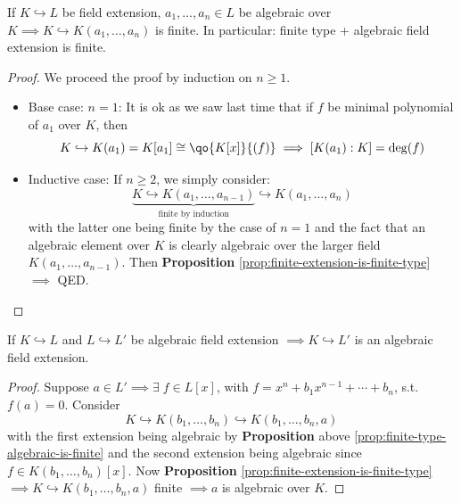 \begin{proposition}
	\label{prop:finite-type-algebraic-is-finite}
	If \( K \hookrightarrow L \) be field extension, \( a_1,\ldots,a_n \in L \) be algebraic over \( K  \implies K
	\hookrightarrow K(a_1,\ldots, a_n)\) is finite. In particular: finite type + algebraic field
	extension is finite.
\end{proposition}

\begin{proof}
	We proceed the proof by induction on \( n \geq 1 \).
	\begin{itemize}
		\item Base case: \( n = 1 \): It is ok as we saw last time that if \( f \) be minimal polynomial
		      of \( a_1 \) over \( K \), then
		      \[
			      K \hookrightarrow K(a_1) = K[a_1] \cong \qo{K[x]}{(f)} \implies [K(a_1): K] = \deg(f)
		      \]
		\item Inductive case: If \( n \geq 2 \), we simply consider:
		      \[
			      \underbrace{K \hookrightarrow K(a_1,\ldots,a_{n-1})}_{\text{finite by induction}}
			      \hookrightarrow K(a_1,\ldots, a_n)
		      \]
		      with the latter one being finite by the case of \( n=1 \) and the fact that an algebraic
		      element over \( K \) is clearly algebraic over the larger field \( K(a_1,\ldots,a_{n-1}) \).
		      Then \textbf{Proposition} \ref{prop:finite-extension-is-finite-type} \( \implies
		      \) QED.
	\end{itemize}
\end{proof}

\begin{proposition}
	\label{prop:algebraic-extension-is-algebraic}
	If \( K \hookrightarrow L \) and \( L \hookrightarrow L' \) be algebraic field extension \( \implies K \hookrightarrow
	L'\) is an algebraic field extension.
\end{proposition}

\begin{proof}
	Suppose \( a\in L' \implies \exists \; f\in L[x] \), with \( f = x^n + b_1 x^{n-1} + \cdots + b_n \), s.t.
	\( f(a) = 0 \). Consider
	\[
		K \hookrightarrow K(b_1,\ldots, b_n) \hookrightarrow K(b_1,\ldots, b_n, a)
	\]
	with the first extension being algebraic by \textbf{Proposition} above
	\ref{prop:finite-type-algebraic-is-finite} and the second extension being
	algebraic since \( f \in K(b_1,\ldots, b_n)[x] \). Now \textbf{Proposition}
	\ref{prop:finite-extension-is-finite-type} \( \implies K \hookrightarrow
	K(b_1,\ldots, b_n,a) \) finite \( \implies a \) is algebraic over \( K \).
\end{proof}

